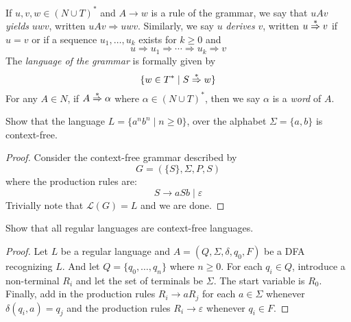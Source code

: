 \begin{definition}
    If $u,v,w\in(N\cup T)^*$ and $A\rightarrow w$ is a rule of the grammar, we say that $uAv$ \textit{yields} $uwv$, written $uAv\Rightarrow uwv$. Similarly, we say $u$ \textit{derives} $v$, written $u\overset{*}{\Rightarrow} v$ if $u = v$ or if a sequence $u_1,\ldots,u_k$ exists for $k\ge0$ and 
    \begin{equation*}
        u\Rightarrow u_1\Rightarrow\cdots\Rightarrow u_k\Rightarrow v
    \end{equation*}
    The \textit{language of the grammar} is formally given by 
    \begin{equation*}
        \{w\in T^*\mid S\overset{*}{\Rightarrow} w\}
    \end{equation*}
    For any $A\in N$, if $A\overset{*}{\Rightarrow}\alpha$ where $\alpha\in (N\cup T)^*$, then we say $\alpha$ is a \textit{word} of $A$.
\end{definition}

\begin{example}
    Show that the language $L = \{a^nb^n\mid n\ge0\}$, over the alphabet $\Sigma=\{a,b\}$ is context-free.
\end{example}
\begin{proof}
    Consider the context-free grammar described by 
    \begin{equation*}
        G = (\{S\}, \Sigma, P, S)
    \end{equation*}
    where the production rules are:
    \begin{equation*}
        S\rightarrow aSb\mid\varepsilon
    \end{equation*}
    Trivially note that $\mathcal{L}(G) = L$ and we are done.
\end{proof}

\begin{example}
    Show that all regular languages are context-free languages.
\end{example}
\begin{proof}
    Let $L$ be a regular language and $A = (Q, \Sigma, \delta, q_0, F)$ be a DFA recognizing $L$. And let $Q = \{q_0,\ldots,q_n\}$ where $n\ge 0$. For each $q_i\in Q$, introduce a non-terminal $R_i$ and let the set of terminals be $\Sigma$. The start variable is $R_0$. Finally, add in the production rules $R_i\rightarrow aR_j$ for each $a\in\Sigma$ whenever $\delta(q_i, a) = q_j$ and the production rules $R_i\rightarrow\varepsilon$ whenever $q_i\in F$.
\end{proof}

